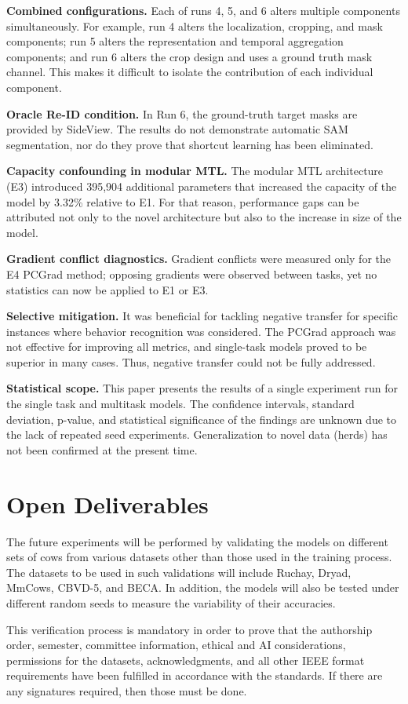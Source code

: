 \textbf{Combined configurations.} Each of runs 4, 5, and 6 alters multiple components simultaneously. For example, run 4 alters the localization, cropping, and mask components; run 5 alters the representation and temporal aggregation components; and run 6 alters the crop design and uses a ground truth mask channel. This makes it difficult to isolate the contribution of each individual component.

\textbf{Oracle Re-ID condition.} In Run 6, the ground-truth target masks are provided by SideView. The results do not demonstrate automatic SAM segmentation, nor do they prove that shortcut learning has been eliminated.

\textbf{Capacity confounding in modular MTL.} The modular MTL architecture (E3) introduced 395,904 additional parameters that increased the capacity of the model by 3.32\% relative to E1. For that reason, performance gaps can be attributed not only to the novel architecture but also to the increase in size of the model.

\textbf{Gradient conflict diagnostics.} Gradient conflicts were measured only for the E4 PCGrad method; opposing gradients were observed between tasks, yet no statistics can now be applied to E1 or E3.

\textbf{Selective mitigation.} It was beneficial for tackling negative transfer for specific instances where behavior recognition was considered. The PCGrad approach was not effective for improving all metrics, and single-task models proved to be superior in many cases. Thus, negative transfer could not be fully addressed.

\textbf{Statistical scope.} This paper presents the results of a single experiment run for the single task and multitask models. The confidence intervals, standard deviation, p-value, and statistical significance of the findings are unknown due to the lack of repeated seed experiments. Generalization to novel data (herds) has not been confirmed at the present time.

\section{Open Deliverables}

The future experiments will be performed by validating the models on different sets of cows from various datasets other than those used in the training process. The datasets to be used in such validations will include Ruchay, Dryad, MmCows, CBVD-5, and BECA. In addition, the models will also be tested under different random seeds to measure the variability of their accuracies.

This verification process is mandatory in order to prove that the authorship order, semester, committee information, ethical and AI considerations, permissions for the datasets, acknowledgments, and all other IEEE format requirements have been fulfilled in accordance with the standards. If there are any signatures required, then those must be done.
